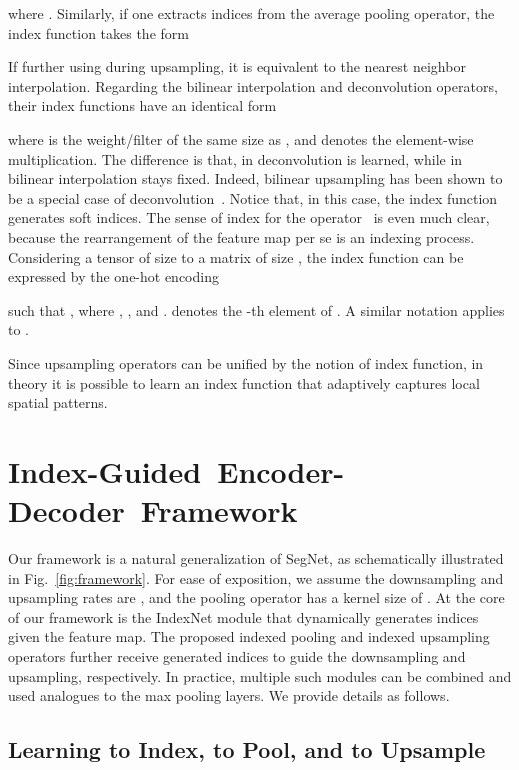 \documentclass[10pt,twocolumn,letterpaper]{article}
\begin{document}
where . Similarly, if one extracts indices from the average pooling operator, the index function takes the form

If further using  during upsampling, it is equivalent to the nearest neighbor interpolation. Regarding the bilinear interpolation and deconvolution operators, their index functions have an identical form

where  is the weight/filter of the same size as , and  denotes the element-wise multiplication. The difference is that,  in deconvolution is learned, while  in bilinear interpolation stays fixed. Indeed, bilinear upsampling has been shown to be a special case of deconvolution~\cite{long2015fully}. Notice that, in this case, the index function generates soft indices. The sense of index for the  operator~\cite{shi2016real} is even much clear, because the rearrangement of the feature map per se is an indexing process. Considering  a tensor  of size  to a matrix  of size , the index function can be expressed by the one-hot encoding

such that , where , , and .  denotes the -th element of . A similar notation applies to .

Since upsampling operators can be unified by the notion of index function, in theory it is possible to learn an index function that adaptively captures local spatial patterns.

\section{\mbox{Index-Guided Encoder-Decoder Framework}}

Our framework is a natural generalization of SegNet, as schematically illustrated in Fig.~\ref{fig:framework}. For ease of exposition, we assume the downsampling and upsampling rates are , and the pooling operator has a kernel size of . At the core of our framework is the IndexNet module that dynamically generates indices given the feature map. The proposed indexed pooling and indexed upsampling operators further receive generated indices to guide the downsampling and upsampling, respectively. In practice, multiple such modules can be combined and used analogues to the max pooling layers. We provide details as follows.

\subsection{Learning to Index, to Pool, and to Upsample}
\end{document}
